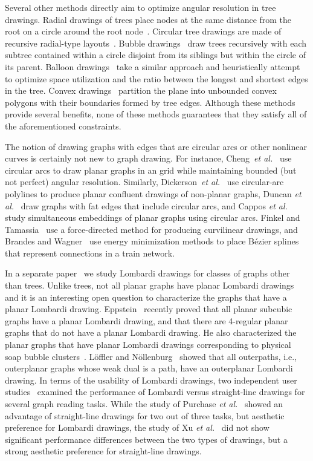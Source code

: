 \documentclass[11pt]{article}
\begin{document}
Several other methods directly aim to optimize angular
resolution in tree drawings.
Radial drawings of trees place nodes at the same distance 
from the root on a circle 
around the root node~\cite{e-df-92}.
Circular tree drawings are made of recursive 
radial-type layouts~\cite{mh-cdrt-98}. 
Bubble drawings~\cite{ga-bt-04} draw trees recursively with each subtree
contained within a circle disjoint from its siblings but
within the circle of its parent.
Balloon drawings~\cite{ly-bdrt-07} take a similar approach
and heuristically attempt to optimize space 
utilization and the ratio between the longest and shortest edges in the tree.
Convex drawings~\cite{ce-tcfoa-07} partition the plane into unbounded convex polygons with their boundaries formed by tree edges.
Although these methods provide several benefits, 
none of these methods guarantees that they satisfy all of 
the aforementioned constraints.

The notion of drawing graphs with edges that are circular arcs
or other nonlinear curves is certainly not new to graph
drawing. For instance, Cheng~{\em et al.}~\cite{cdgk-dpgca} use circular arcs
to draw planar graphs in an  grid
while maintaining bounded (but not perfect) angular resolution.
Similarly, Dickerson~{\em et al.}~\cite{degm-cdvnp-03} use circular-arc
polylines to produce planar confluent drawings of non-planar graphs,
Duncan {\em et al.}~\cite{DBLP:journals/ijfcs/DuncanEKW06} draw
graphs with fat edges that include circular arcs, and
Cappos {\em et al.}~\cite{cefk-sgeb-09} study simultaneous embeddings
of planar graphs using circular arcs.
Finkel and Tamassia~\cite{ft-cgduf-04} use a
force-directed method for producing curvilinear drawings, and Brandes and Wagner~\cite{bw-uglvt-00} use energy minimization methods to place B\'ezier splines that represent connections in a train network. 

In a separate paper~\cite{degkn-ldg-12} we study Lombardi drawings for classes of graphs other than trees. Unlike trees, not all planar graphs have planar Lombardi drawings~\cite{degkn-ldg-12,degkl-ppld-12} and it is an interesting open question to characterize the graphs that have a planar Lombardi drawing. Eppstein~\cite{e-pldsg-12} recently proved that all planar subcubic graphs have a planar Lombardi drawing, and that there are 4-regular planar graphs that do not have a planar Lombardi drawing. He also characterized the planar graphs that have planar Lombardi drawings corresponding to physical soap bubble clusters~\cite{e-gpsb-12}. L\"offler and N\"ollenburg~\cite{ln-pldo-12} showed that all outerpaths, i.e., outerplanar graphs whose weak dual is a path, have an outerplanar Lombardi drawing. In terms of the usability of Lombardi drawings, two independent user studies~\cite{phnk-ulgd-12,xrph-uscegv-12} examined the performance of Lombardi versus straight-line drawings for several graph reading tasks. While the study of Purchase \emph{et al.}~\cite{phnk-ulgd-12} showed an advantage  of straight-line drawings for two out of three tasks, but aesthetic preference for Lombardi drawings, the study of Xu \emph{et al.}~\cite{xrph-uscegv-12} did not show significant performance differences between the two types of drawings, but a strong aesthetic preference for straight-line drawings.
\end{document}
